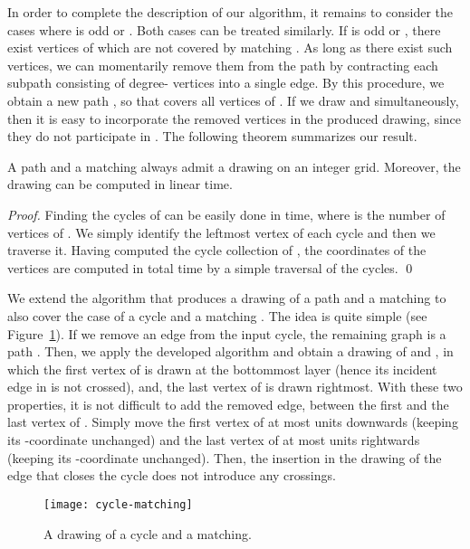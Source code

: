 \documentclass{llncs}
\begin{document}
In order to complete the description of our algorithm, it remains to
consider the cases where  is odd or . Both
cases can be treated similarly. If  is odd or
, there exist vertices of  which
are not covered by matching . As long as there exist
such vertices, we can momentarily remove them from the path by
contracting each subpath consisting of degree- vertices into a
single edge. By this procedure, we obtain a new path ,
so that  covers all vertices of . If we
draw  and  simultaneously, then it is
easy to incorporate the removed vertices in the produced drawing,
since they do not participate in . The following
theorem summarizes our result.

\begin{theorem}
\label{thm:path-matching} A path and a matching always admit a
 drawing on an  integer grid.
Moreover, the drawing can be computed in linear time.
\end{theorem}
\begin{proof}
Finding the cycles of  can be
easily done in  time, where  is the number of vertices of
. We simply identify the leftmost vertex of each cycle
and then we traverse it. Having computed the cycle collection of
, the coordinates of the
vertices are computed in  total time by a simple traversal of
the cycles. \qed
\end{proof}


We extend the algorithm that produces a  drawing of a path
and a matching to also cover the case of a cycle  and a
matching . The idea is quite simple (see
Figure~\ref{fig:cycle-matching}). If we remove an edge from the
input cycle, the remaining graph is a path . Then, we
apply the developed algorithm and obtain a  drawing of
 and , in which the first vertex of
 is drawn at the bottommost layer (hence its incident
edge in  is not crossed), and, the last vertex of
 is drawn rightmost. With these two properties, it is
not difficult to add the removed edge, between the first and the
last vertex of . Simply move the first vertex of
 at most  units downwards (keeping its
-coordinate unchanged) and the last vertex of  at
most  units rightwards (keeping its -coordinate
unchanged). Then, the insertion in the drawing of the edge that
closes the cycle does not introduce any crossings.

\begin{figure}[h!tb]
  \centering
  \texttt{[image: cycle-matching]}
  \caption{A  drawing of a cycle and a matching.}
  \label{fig:cycle-matching}
\end{figure}
\end{document}
